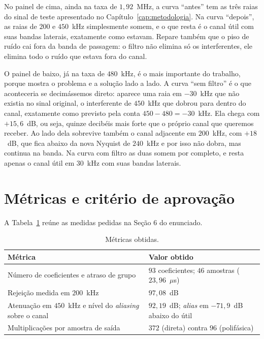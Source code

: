 No painel de cima, ainda na taxa de $1{,}92$~MHz, a curva ``antes'' tem as três raias do sinal de teste apresentado no Capítulo~\ref{cap:metodologia}. Na curva ``depois'', as raias de $200$ e $450$~kHz simplesmente somem, e o que resta é o canal útil com suas bandas laterais, exatamente como estavam. Repare também que o piso de ruído cai fora da banda de passagem: o filtro não elimina só os interferentes, ele elimina todo o ruído que estava fora do canal.

O painel de baixo, já na taxa de $480$~kHz, é o mais importante do trabalho, porque mostra o problema e a solução lado a lado. A curva ``sem filtro'' é o que aconteceria se decimássemos direto: aparece uma raia em $-30$~kHz que não existia no sinal original, o interferente de $450$~kHz que dobrou para dentro do canal, exatamente como previsto pela conta $450 - 480 = -30$~kHz. Ela chega com $+15{,}6$~dB, ou seja, quinze decibéis mais forte que o próprio canal que queremos receber. Ao lado dela sobrevive também o canal adjacente em $200$~kHz, com $+18$~dB, que fica abaixo da nova Nyquist de $240$~kHz e por isso não dobra, mas continua na banda. Na curva com filtro as duas somem por completo, e resta apenas o canal útil em $30$~kHz com suas bandas laterais.

\section{Métricas e critério de aprovação}

A Tabela~\ref{tab:metricas} reúne as medidas pedidas na Seção 6 do enunciado.

\begin{table}[htb]
\centering
\caption{Métricas obtidas.}
\label{tab:metricas}
\begin{tabular}{p{7.5cm}p{6cm}}
\hline
\textbf{Métrica} & \textbf{Valor obtido} \\
\hline
Número de coeficientes e atraso de grupo & $93$ coeficientes; $46$ amostras ($23{,}96$~$\mu$s) \\
Rejeição medida em $200$~kHz & $97{,}08$~dB \\
Atenuação em $450$~kHz e nível do \textit{aliasing} sobre o canal & $92{,}19$~dB; \textit{alias} em $-71{,}9$~dB abaixo do útil \\
Multiplicações por amostra de saída & $372$ (direta) contra $96$ (polifásica) \\
\hline
\end{tabular}
\end{table}

